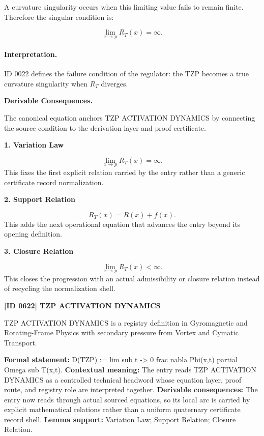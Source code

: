 A curvature singularity occurs when this limiting value fails to remain finite. Therefore the singular condition is:

\begin{equation}
\boxed{
\lim_{x\to p}R_T(x)=\infty .
}
\end{equation}

\paragraph{Interpretation.}
ID 0022 defines the failure condition of the regulator: the TZP becomes a true curvature singularity when $R_T$ diverges.

\par\vspace{0.35em}
\noindent\textbf{Derivable Consequences.}\quad
\begingroup
\footnotesize
\raggedright
The canonical equation anchors TZP ACTIVATION DYNAMICS by connecting the source condition to the derivation layer and proof certificate.
\par\endgroup

\noindent\textbf{1. Variation Law}\par
\[
\lim_{x\to p}R_T(x)=\infty.
\]
\noindent This fixes the first explicit relation carried by the entry rather than a generic certificate record normalization.\par
\noindent\textbf{2. Support Relation}\par
\[
R_T(x)=R(x)+f(x).
\]
\noindent This adds the next operational equation that advances the entry beyond its opening definition.\par
\noindent\textbf{3. Closure Relation}\par
\[
\lim_{x\to p}R_T(x)<\infty.
\]
\noindent This closes the progression with an actual admissibility or closure relation instead of recycling the normalization shell.\par

\clearpage
\noindent\textbf{[ID 0622] TZP ACTIVATION DYNAMICS}\par
\vspace{0.35em}
\begingroup\small
{}
TZP ACTIVATION DYNAMICS is a registry definition in Gyromagnetic and Rotating-Frame Physics with secondary pressure from Vortex and Cymatic Transport.

\begingroup\footnotesize\setlength{\emergencystretch}{3em}\sloppy
\textbf{Formal statement:} D(TZP) := lim sub t -> 0 frac nabla Phi(x,t) partial Omega sub T(x,t). \textbf{Contextual meaning:} The entry reads TZP ACTIVATION DYNAMICS as a controlled technical headword whose equation layer, proof route, and registry role are interpreted together. \textbf{Derivable consequences:} The entry now reads through actual sourced equations, so its local arc is carried by explicit mathematical relations rather than a uniform quaternary certificate record shell. \textbf{Lemma support:} Variation Law; Support Relation; Closure Relation.\par
\endgroup

